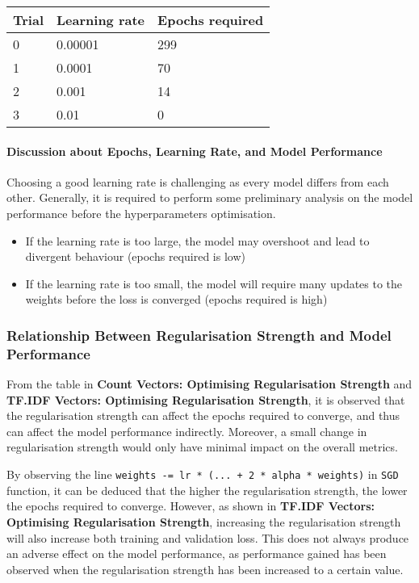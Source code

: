 \documentclass[11pt]{article}
\providecommand{\tightlist}{%
      \setlength{\itemsep}{0pt}\setlength{\parskip}{0pt}}
\begin{document}
\begin{longtable}[]{@{}lll@{}}
\toprule
Trial & Learning rate & Epochs required\tabularnewline
\midrule
\endhead
0 & 0.00001 & 299\tabularnewline
1 & 0.0001 & 70\tabularnewline
2 & 0.001 & 14\tabularnewline
3 & 0.01 & 0\tabularnewline
\bottomrule
\end{longtable}

\hypertarget{discussion-about-epochs-learning-rate-and-model-performance}{%
\paragraph{Discussion about Epochs, Learning Rate, and Model
Performance}\label{discussion-about-epochs-learning-rate-and-model-performance}}

Choosing a good learning rate is challenging as every model differs from
each other. Generally, it is required to perform some preliminary
analysis on the model performance before the hyperparameters
optimisation.

\begin{itemize}
\tightlist
\item
  If the learning rate is too large, the model may overshoot and lead to
  divergent behaviour (epochs required is low)
\item
  If the learning rate is too small, the model will require many updates
  to the weights before the loss is converged (epochs required is high)
\end{itemize}

\hypertarget{relationship-between-regularisation-strength-and-model-performance}{%
\subsubsection{Relationship Between Regularisation Strength and Model
Performance}\label{relationship-between-regularisation-strength-and-model-performance}}

From the table in \textbf{Count Vectors: Optimising Regularisation
Strength} and \textbf{TF.IDF Vectors: Optimising Regularisation
Strength}, it is observed that the regularisation strength can affect
the epochs required to converge, and thus can affect the model
performance indirectly. Moreover, a small change in regularisation
strength would only have minimal impact on the overall metrics.

By observing the line
\texttt{weights\ -=\ lr\ *\ (...\ +\ 2\ *\ alpha\ *\ weights)} in
\texttt{SGD} function, it can be deduced that the higher the
regularisation strength, the lower the epochs required to converge.
However, as shown in \textbf{TF.IDF Vectors: Optimising Regularisation
Strength}, increasing the regularisation strength will also increase
both training and validation loss. This does not always produce an
adverse effect on the model performance, as performance gained has been
observed when the regularisation strength has been increased to a
certain value.
\end{document}
